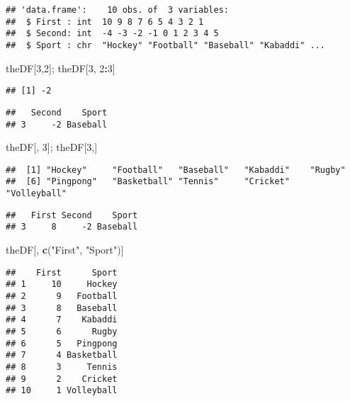 \documentclass[
]{article}
\newenvironment{Shaded}{\begin{snugshade}}{\end{snugshade}}
\newcommand{\DecValTok}[1]{\textcolor[rgb]{0.00,0.00,0.81}{#1}}
\newcommand{\FunctionTok}[1]{\textcolor[rgb]{0.13,0.29,0.53}{\textbf{#1}}}
\newcommand{\NormalTok}[1]{#1}
\newcommand{\SpecialCharTok}[1]{\textcolor[rgb]{0.81,0.36,0.00}{\textbf{#1}}}
\newcommand{\StringTok}[1]{\textcolor[rgb]{0.31,0.60,0.02}{#1}}
\begin{document}
\begin{verbatim}
## 'data.frame':    10 obs. of  3 variables:
##  $ First : int  10 9 8 7 6 5 4 3 2 1
##  $ Second: int  -4 -3 -2 -1 0 1 2 3 4 5
##  $ Sport : chr  "Hockey" "Football" "Baseball" "Kabaddi" ...
\end{verbatim}

\begin{Shaded}
\begin{Highlighting}[]
\NormalTok{theDF[}\DecValTok{3}\NormalTok{,}\DecValTok{2}\NormalTok{]; theDF[}\DecValTok{3}\NormalTok{, }\DecValTok{2}\SpecialCharTok{:}\DecValTok{3}\NormalTok{]}
\end{Highlighting}
\end{Shaded}

\begin{verbatim}
## [1] -2
\end{verbatim}

\begin{verbatim}
##   Second    Sport
## 3     -2 Baseball
\end{verbatim}

\begin{Shaded}
\begin{Highlighting}[]
\NormalTok{theDF[, }\DecValTok{3}\NormalTok{]; theDF[}\DecValTok{3}\NormalTok{,]}
\end{Highlighting}
\end{Shaded}

\begin{verbatim}
##  [1] "Hockey"     "Football"   "Baseball"   "Kabaddi"    "Rugby"     
##  [6] "Pingpong"   "Basketball" "Tennis"     "Cricket"    "Volleyball"
\end{verbatim}

\begin{verbatim}
##   First Second    Sport
## 3     8     -2 Baseball
\end{verbatim}

\begin{Shaded}
\begin{Highlighting}[]
\NormalTok{theDF[, }\FunctionTok{c}\NormalTok{(}\StringTok{"First"}\NormalTok{, }\StringTok{"Sport"}\NormalTok{)]}
\end{Highlighting}
\end{Shaded}

\begin{verbatim}
##    First      Sport
## 1     10     Hockey
## 2      9   Football
## 3      8   Baseball
## 4      7    Kabaddi
## 5      6      Rugby
## 6      5   Pingpong
## 7      4 Basketball
## 8      3     Tennis
## 9      2    Cricket
## 10     1 Volleyball
\end{verbatim}
\end{document}
